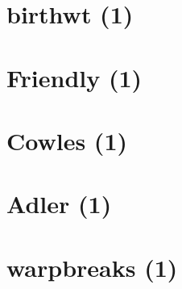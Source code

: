 \documentclass[
]{book}
\begin{document}
\hypertarget{birthwt-1}{%
\section{birthwt (1)}\label{birthwt-1}}

\hypertarget{friendly-1}{%
\section{Friendly (1)}\label{friendly-1}}

\hypertarget{cowles-1}{%
\section{Cowles (1)}\label{cowles-1}}

\hypertarget{adler-1}{%
\section{Adler (1)}\label{adler-1}}

\hypertarget{warpbreaks-1}{%
\section{warpbreaks (1)}\label{warpbreaks-1}}

  
\end{document}

